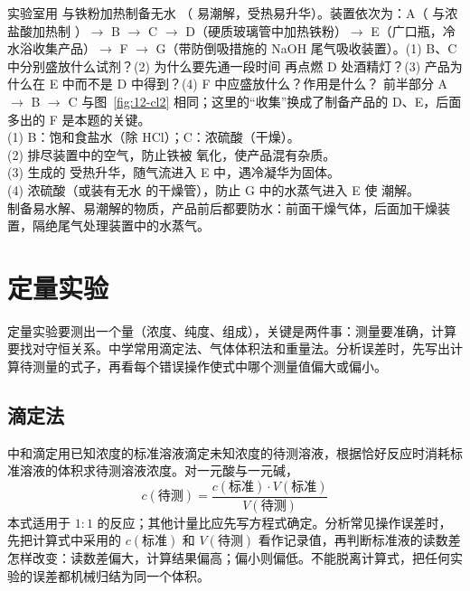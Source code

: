 \begin{liti}[综合·易潮解物质的制备]
实验室用  与铁粉加热制备无水 （ 易潮解，受热易升华）。装置依次为：A（ 与浓盐酸加热制 ）$\to$ B $\to$ C $\to$ D（硬质玻璃管中加热铁粉）$\to$ E（广口瓶，冷水浴收集产品）$\to$ F $\to$ G（带防倒吸措施的 NaOH 尾气吸收装置）。(1) B、C 中分别盛放什么试剂？(2) 为什么要先通一段时间  再点燃 D 处酒精灯？(3) 产品为什么在 E 中而不是 D 中得到？(4) F 中应盛放什么？作用是什么？
\tcblower
\silu 前半部分 A $\to$ B $\to$ C 与图~\ref{fig:12-cl2} 相同；这里的“收集”换成了制备产品的 D、E，后面多出的 F 是本题的关键。\\
\jie (1) B：饱和食盐水（除 HCl）；C：浓硫酸（干燥）。\\
(2) 排尽装置中的空气，防止铁被  氧化，使产品混有杂质。\\
(3) 生成的  受热升华，随气流进入 E 中，遇冷凝华为固体。\\
(4) 浓硫酸（或装有无水  的干燥管），防止 G 中的水蒸气进入 E 使  潮解。\\
\dianbo 制备易水解、易潮解的物质，产品前后都要防水：前面干燥气体，后面加干燥装置，隔绝尾气处理装置中的水蒸气。
\end{liti}

\section{定量实验}\label{sec:12-dingliang}

定量实验要测出一个量（浓度、纯度、组成），关键是两件事：测量要准确，计算要找对守恒关系。中学常用滴定法、气体体积法和重量法。分析误差时，先写出计算待测量的式子，再看每个错误操作使式中哪个测量值偏大或偏小。

\subsection{滴定法}

中和滴定用已知浓度的标准溶液滴定未知浓度的待测溶液，根据恰好反应时消耗标准溶液的体积求待测溶液浓度。对一元酸与一元碱，
\[c(\text{待测})=\frac{c(\text{标准})\cdot V(\text{标准})}{V(\text{待测})}\]
本式适用于 $1:1$ 的反应；其他计量比应先写方程式确定。分析常见操作误差时，先把计算式中采用的 $c(\text{标准})$ 和 $V(\text{待测})$ 看作记录值，再判断标准液的读数差怎样改变：读数差偏大，计算结果偏高；偏小则偏低。不能脱离计算式，把任何实验的误差都机械归结为同一个体积。

